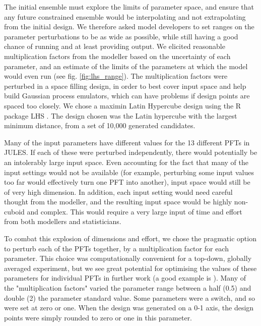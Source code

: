 \documentclass[gmd, manuscript]{copernicus}
\begin{document}
The initial ensemble must explore the limits of parameter space, and ensure that any future constrained ensemble would be interpolating and not extrapolating from the initial design. We therefore asked model developers to set ranges on the parameter perturbations to be as wide as possible, while still having a good chance of running and at least providing output. We elicited reasonable multiplication factors from the modeller based on the uncertainty of each parameter, and an estimate of the limits of the parameters at which the model would even run (see fig. \ref{fig:lhs_range}). The multiplication factors were perturbed in a space filling design, in order to best cover input space and help build Gaussian process emulators, which can have problems if design points are spaced too closely. We chose a maximin Latin Hypercube design using the R package LHS \citep{Rpackage2021lhs}. The design chosen was the Latin hypercube with the largest minimum distance, from a set of 10,000 generated candidates.

Many of the input parameters have different values for the 13 different PFTs in JULES. If each of these were perturbed independently, there would potentially be an intolerably large input space. Even accounting for the fact that many of the input settings would not be available (for example, perturbing some input values too far would effectively turn one PFT into another), input space would still be of very high dimension. In addition, each input setting would need careful thought from the modeller, and the resulting input space would be highly non-cuboid and complex. This would require a very large input of time and effort from both modellers and statisticians.

To combat this explosion of dimensions and effort, we chose the pragmatic option to perturb each of the PFTs together, by a multiplication factor for each parameter. This choice was computationally convenient for a top-down, globally averaged experiment, but we see great potential for optimising the values of these parameters for individual PFTs in further work (a good example is \cite{gmd-15-1913-2022}). Many of the "multiplication factors" varied the parameter range between a half (0.5) and double (2) the parameter standard value. Some parameters were a switch, and so were set at zero or one. When the design was generated on a 0-1 axis, the design points were simply rounded to zero or one in this parameter.
\end{document}
